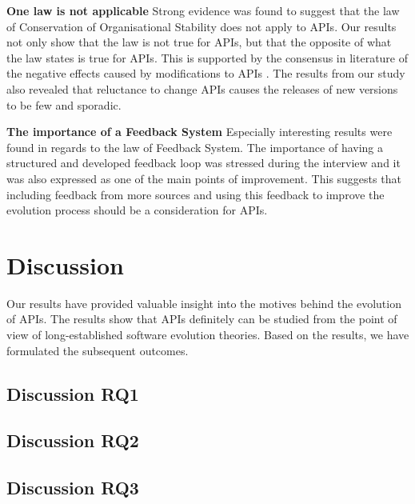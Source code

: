 \documentclass{sig-alternate}
\begin{document}
\smallskip \noindent
\textbf{One law is not applicable  } %
Strong evidence was found to suggest that the law of Conservation of Organisational Stability does not apply to APIs. Our results not only show that the law is not true for APIs, but that the opposite of what the law states is true for APIs. This is supported by the consensus in literature of the negative effects caused by modifications to APIs \cite{google_talk} \cite{henning2007api} \cite{mcdonnell2013empirical} \cite{robbes2012developers}. The results from our study also revealed that reluctance to change APIs causes the releases of new versions to be few and sporadic. 

\smallskip \noindent
\textbf{The importance of a Feedback System  } %
Especially interesting results were found in regards to the law of Feedback System. The importance of having a structured and developed feedback loop was stressed during the interview and it was also expressed as one of the main points of improvement. This suggests that including feedback from more sources and using this feedback to improve the evolution process should be a consideration for APIs. 

\newpage

\section{Discussion} \label{discussion}
Our results have provided valuable insight into the motives behind the evolution of APIs. The results show that APIs definitely can be studied from the point of view of long-established software evolution theories. Based on the results, we have formulated the subsequent outcomes. 

\subsection{Discussion RQ1}  




\subsection{Discussion RQ2}



\subsection{Discussion RQ3}
\end{document}
